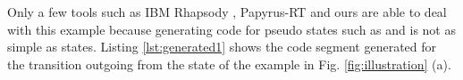 Only a few tools such as IBM Rhapsody \cite{ibm_rhapsody}, Papyrus-RT \cite{possepapyrusrt} and ours are able to deal with this example because generating code for pseudo states such as  and  is not as simple as states.
Listing \ref{lst:generated1} shows the code segment generated for the transition outgoing from the state  of the example in Fig. \ref{fig:illustration} (a). 









